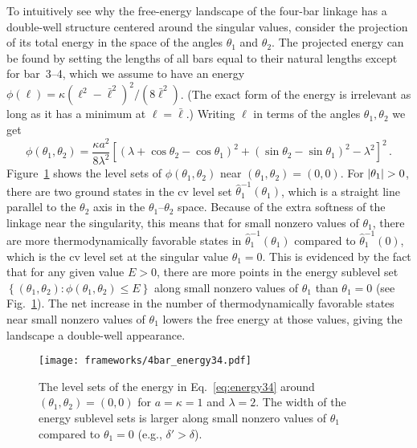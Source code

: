 To intuitively see why the free-energy landscape of the four-bar linkage has a double-well structure centered around the singular values, consider the projection of its total energy in the space of the angles $\theta_{1}$ and $\theta_{2}$.
The projected energy can be found by setting the lengths of all bars equal to their natural lengths except for bar~3--4, which we assume to have an energy $\phi(\ell) = \kappa(\ell^{2} - \bar{\ell}^{2})^{2}/(8\bar{\ell}^{2})$.
(The exact form of the energy is irrelevant as long as it has a minimum at $\ell = \bar{\ell}$.)
Writing $\ell$ in terms of the angles $\theta_{1}, \theta_{2}$ we get
%
\begin{equation}
  \phi(\theta_{1}, \theta_{2}) = \frac{\kappa a^{2}}{8\lambda^{2}}\left[(\lambda + \cos\theta_{2} - \cos\theta_{1})^{2} + (\sin\theta_{2} - \sin\theta_{1})^{2} - \lambda^{2}\right]^{2}\,.
  \label{eq:energy34}
\end{equation}
%
Figure~\ref{fig:energy34} shows the level sets of $\phi(\theta_{1}, \theta_{2})$ near $(\theta_{1}, \theta_{2}) = (0, 0)$.
For $\lvert\theta_{1}\rvert > 0$, there are two ground states in the \ac{cv} level set $\hat{\theta}_{1}^{-1}(\theta_{1})$, which is a straight line parallel to the $\theta_{2}$ axis in the $\theta_{1}$--$\theta_{2}$ space.
Because of the extra softness of the linkage near the singularity, this means that for small nonzero values of $\theta_{1}$, there are more thermodynamically favorable states in $\hat{\theta}_{1}^{-1}(\theta_{1})$ compared to $\hat{\theta}_{1}^{-1}(0)$, which is the \ac{cv} level set at the singular value $\theta_{1}=0$.
This is evidenced by the fact that for any given value $E > 0$, there are more points in the energy sublevel set $\left\{(\theta_{1}, \theta_{2}): \phi(\theta_{1}, \theta_{2}) \leq E\right\}$ along small nonzero values of $\theta_{1}$ than $\theta_{1} = 0$ (see Fig.~\ref{fig:energy34}).
The net increase in the number of thermodynamically favorable states near small nonzero values of $\theta_{1}$ lowers the free energy at those values, giving the landscape a double-well appearance.
%
\begin{figure}
  \begin{center}
    \texttt{[image: frameworks/4bar\_energy34.pdf]}
  \end{center}
  \caption{The level sets of the energy in Eq.~\eqref{eq:energy34} around $(\theta_{1}, \theta_{2}) = (0, 0)$ for $a = \kappa = 1$ and $\lambda = 2$.  The width of the energy sublevel sets is larger along small nonzero values of $\theta_{1}$ compared to $\theta_{1} = 0$ (e.g., $\delta' > \delta$).}
  \label{fig:energy34}
\end{figure}

